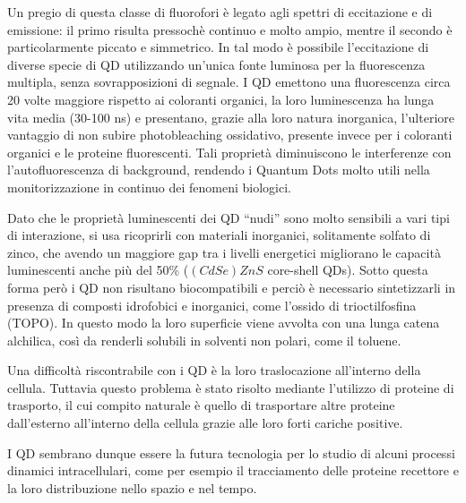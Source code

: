 Un pregio di questa classe di fluorofori è legato agli spettri di eccitazione e di emissione: il primo risulta pressochè continuo e molto ampio, mentre il secondo è particolarmente piccato e simmetrico. 
In tal modo è possibile l'eccitazione di diverse specie di QD utilizzando un'unica fonte luminosa per la fluorescenza multipla, senza sovrapposizioni di segnale.
I QD emettono una fluorescenza circa 20 volte maggiore rispetto ai coloranti organici, la loro luminescenza ha lunga vita media (30-100 ns) e presentano, grazie alla loro natura inorganica, l'ulteriore vantaggio di non subire photobleaching ossidativo, presente invece per i coloranti organici e le proteine fluorescenti. 
Tali proprietà diminuiscono le interferenze con l'autofluorescenza di background, rendendo i Quantum Dots molto utili nella monitorizzazione in continuo dei fenomeni biologici. 

Dato che le proprietà luminescenti dei QD ``nudi'' sono molto sensibili a vari tipi di interazione, si usa ricoprirli con materiali inorganici, solitamente solfato di zinco, che avendo un maggiore gap tra i livelli energetici migliorano le capacità luminescenti anche più del 50\% ($(CdSe)ZnS$ core-shell QDs).
Sotto questa forma però i QD non risultano biocompatibili e perciò è necessario sintetizzarli in presenza di composti idrofobici e inorganici, come l'ossido di trioctilfosfina (TOPO). 
In questo modo la loro superficie viene avvolta con una lunga catena alchilica, così da renderli solubili in solventi non polari, come il toluene. 

Una difficoltà riscontrabile con i QD è la loro traslocazione all'interno della cellula. 
Tuttavia questo problema è stato risolto mediante l'utilizzo di proteine di trasporto, il cui compito naturale è quello di trasportare altre proteine dall'esterno all'interno della cellula grazie alle loro forti cariche positive.

I QD sembrano dunque essere la futura tecnologia per lo studio di alcuni processi dinamici intracellulari, come per esempio il tracciamento delle proteine recettore e la loro distribuzione nello spazio e nel tempo.
